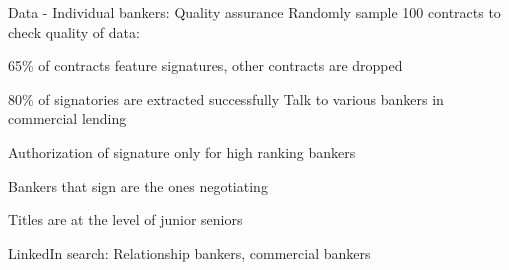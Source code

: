 \documentclass[notes,11pt, aspectratio=169]{beamer}
\newenvironment{wideitemize}{\itemize\addtolength{\itemsep}{10pt}  \setlength\itemsep{.5em}}{\enditemize}
\begin{document}
\begin{frame}[label=appendix_bankers]{Data - Individual bankers: Quality assurance}
Randomly sample 100 contracts to check quality of data:
\begin{wideitemize}
  \item 65\% of contracts feature signatures, other contracts are dropped
  \item 80\% of signatories are extracted successfully
\end{wideitemize}
\vspace{.3cm}
Talk to various bankers in commercial lending
\begin{wideitemize}
  \item Authorization of signature only for high ranking bankers
  \item Bankers that sign are the ones negotiating
  \item Titles are at the level of junior seniors
  \item LinkedIn search: Relationship bankers, commercial bankers     
\end{wideitemize}
\hfill \hyperlink{data_bankers}{}
\end{frame}
\end{document}
